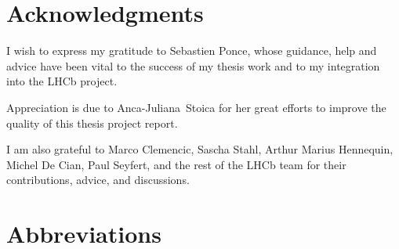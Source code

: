 \documentclass[12pt]{article}
\begin{document}
\newpage
\section*{Acknowledgments}

I wish to express my gratitude to Sebastien Ponce, whose guidance, help and advice have been vital to the success of my thesis work and to my integration into the LHCb project.

\noindent Appreciation is due to Anca-Juliana Stoica for her great efforts to improve the quality of this thesis project report.

\noindent I am also grateful to Marco Clemencic, Sascha Stahl, Arthur Marius Hennequin, Michel De Cian, Paul Seyfert, and the rest of the LHCb team for their contributions, advice, and discussions.



\newpage
{
	\small
	\hypersetup{linkcolor=black}
	\tableofcontents
}

\newpage
{
	\small
	\hypersetup{linkcolor=black}
	\listoffigures
}

\newpage
{
	\small
	\hypersetup{linkcolor=black}
	\listoftables
}

{
	\small
	\renewcommand\lstlistlistingname{Code Listings}
	\hypersetup{linkcolor=black}
	\lstlistoflistings
}


\section*{Abbreviations}
\end{document}
